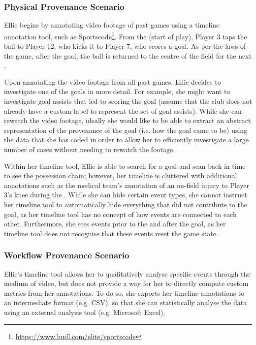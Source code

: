 {}

\subsubsection{Physical Provenance Scenario}

{Ellie begins by annotating video footage of past games using a timeline
annotation tool, such as Sportscode\footnote{\url{https://www.hudl.com/elite/sportscode}}. From the
\centrebounce{} (start of play), Player 3 taps the ball to Player 12, who
kicks it to Player 7, who scores a goal. As per the laws of the game,
after the goal, the ball is returned to the centre of the field for the
next \centrebounce{}.}

{}

{Upon annotating the video footage from all past games, Ellie decides to
investigate one of the goals in more detail. For example, she might
want to investigate goal assists that led to scoring the goal (assume
that the club does not already have a custom label to represent the set
of goal assists). While she can rewatch the video footage, ideally she
would like to be able to extract an abstract representation of the
provenance of the goal (i.e. how the goal came to be) using the data
that she has coded in order to allow her to efficiently investigate a
large number of cases without needing to rewatch the footage.}

{}

{Within her timeline tool, Ellie is able to search for a goal and scan
back in time to see the possession chain; however, her timeline is
cluttered with additional annotations such as the medical team's
annotation of an on-field injury to Player 3's knee during the \centrebounce{}. While she can hide
certain event types, she cannot instruct her timeline tool to
automatically hide everything that did not contribute to the goal, as
her timeline tool has no concept of how events are connected to each
other. Furthermore, she sees events prior to the \centrebounce{} and after
the goal, as her timeline tool does not recognise that these events
reset the game state.}

{}

\subsubsection{Workflow Provenance Scenario}

{Ellie's timeline tool allows her to qualitatively analyse specific
events through the medium of video, but does not provide a way for her
to directly compute custom metrics from her annotations. To do so, she
exports her timeline annotations to an intermediate format (e.g. CSV),
so that she can statistically analyse the data using an external
analysis tool (e.g. Microsoft Excel).}

